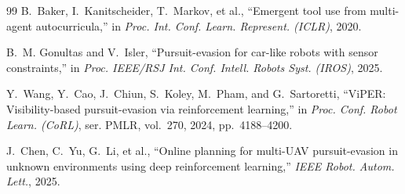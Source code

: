 \documentclass[letterpaper,10pt,conference]{ieeeconf}
\begin{document}
\begin{thebibliography}{99}
B.~Baker, I.~Kanitscheider, T.~Markov, et al., ``Emergent tool use from
multi-agent autocurricula,'' in \emph{Proc. Int. Conf. Learn. Represent.
(ICLR)}, 2020.

B.~M. Gonultas and V.~Isler, ``Pursuit-evasion for car-like robots with
sensor constraints,'' in \emph{Proc. IEEE/RSJ Int. Conf. Intell. Robots
Syst. (IROS)}, 2025.

Y.~Wang, Y.~Cao, J.~Chiun, S.~Koley, M.~Pham, and G.~Sartoretti,
``ViPER: Visibility-based pursuit-evasion via reinforcement learning,''
in \emph{Proc. Conf. Robot Learn. (CoRL)}, ser. PMLR, vol.~270, 2024,
pp.~4188--4200.

J.~Chen, C.~Yu, G.~Li, et al., ``Online planning for multi-UAV
pursuit-evasion in unknown environments using deep reinforcement
learning,'' \emph{IEEE Robot. Autom. Lett.}, 2025.

\end{thebibliography}
\end{document}
